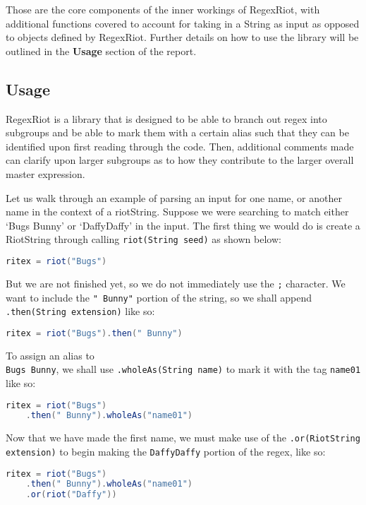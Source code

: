 \documentclass[conference]{IEEEtran}
\begin{document}
Those are the core components of the inner workings of RegexRiot,
with additional functions covered to account for taking in a String
as input as opposed to objects defined by RegexRiot.
Further details on how to use the library will be outlined in
the \textbf{Usage} section of the report.

\subsection{Usage}
RegexRiot is a library that is designed to be able to branch out regex into
subgroups and be able to mark them with a certain alias such that they can
be identified upon first reading through the code. Then, additional
comments made can clarify upon larger subgroups as to how they
contribute to the larger overall master expression.

Let us walk through an example of parsing an input for one name,
or another name in the context of a riotString.
Suppose we were searching to match either `Bugs Bunny'
or `DaffyDaffy' in the input. The first thing we would do is
create a RiotString through calling \texttt{riot(String seed)} as shown below:

\begin{lstlisting}[language=Java]
ritex = riot("Bugs")
\end{lstlisting}

But we are not finished yet, so we do not immediately use the \texttt{;}
character. We want to include the \texttt{" Bunny"} portion of the string,
so we shall append \\
\texttt{.then(String extension)} like so:

\begin{lstlisting}[language=Java]
ritex = riot("Bugs").then(" Bunny")
\end{lstlisting}

To assign an alias to \\
\texttt{Bugs Bunny}, we shall use \texttt{.wholeAs(String name)}
to mark it with the tag \texttt{name01} like so:

\begin{lstlisting}[language=Java]
ritex = riot("Bugs")
    .then(" Bunny").wholeAs("name01")
\end{lstlisting}

Now that we have made the first name, we must make use of the
\texttt{.or(RiotString extension)} to begin making the \texttt{DaffyDaffy}
portion of the regex, like so:

\begin{lstlisting}[language=Java]
ritex = riot("Bugs")
    .then(" Bunny").wholeAs("name01")
    .or(riot("Daffy"))
\end{lstlisting}
\end{document}
